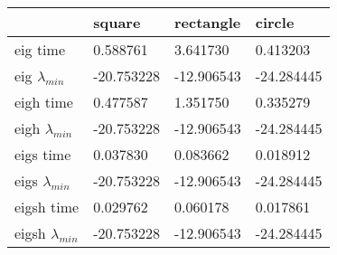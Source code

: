\begin{tabular}{llll}
\toprule
 & square & rectangle & circle \\
\midrule
eig time & 0.588761 & 3.641730 & 0.413203 \\
eig $\lambda_{min}$ & -20.753228 & -12.906543 & -24.284445 \\
eigh time & 0.477587 & 1.351750 & 0.335279 \\
eigh $\lambda_{min}$ & -20.753228 & -12.906543 & -24.284445 \\
eigs time & 0.037830 & 0.083662 & 0.018912 \\
eigs $\lambda_{min}$ & -20.753228 & -12.906543 & -24.284445 \\
eigsh time & 0.029762 & 0.060178 & 0.017861 \\
eigsh $\lambda_{min}$ & -20.753228 & -12.906543 & -24.284445 \\
\bottomrule
\end{tabular}
